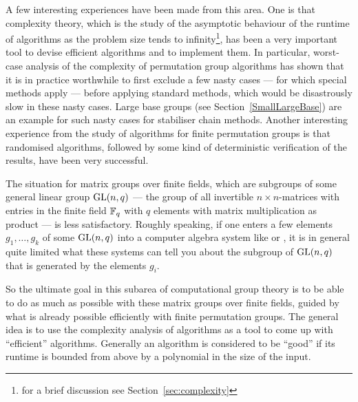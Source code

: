 A few interesting experiences have been made from this area. One is that 
complexity theory,
which is the study of the asymptotic behaviour of the runtime of algorithms 
as the problem size tends to infinity\footnote{for a brief discussion see 
Section~\ref{sec:complexity}}, has been a very important tool to
devise efficient algorithms and to implement them. In particular,
worst-case analysis of the complexity of permutation group 
algorithms has shown that
it is in practice worthwhile to first exclude a few nasty cases ---
for which special methods apply --- before applying standard methods,
which would be disastrously slow in these nasty cases. Large base
groups (see Section~\ref{SmallLargeBase}) are an example for such
nasty cases for stabiliser chain methods.
Another interesting
experience from the study of algorithms for finite permutation groups 
is that randomised algorithms, followed by some kind of
deterministic verification of the results, have been very successful.

The situation for matrix groups over finite fields, which are subgroups 
of some general linear group $\GL(n,q)$ --- the group of all
invertible $n \times n$-matrices with entries in the finite field
$\mathbb{F}_q$ with $q$ elements with matrix multiplication as product ---
is less satisfactory. Roughly speaking, if one enters a few
elements $g_1, \ldots, g_k$ of some $\GL(n,q)$ into a computer algebra 
system like {\GAP} or {\MAGMA}, it is in general quite limited what
these systems can tell you about the subgroup of $\GL(n,q)$ that is
generated by the elements $g_i$.

So the ultimate goal in this subarea of computational group theory
is to be able to do as much as possible with these matrix groups over
finite fields, guided by what is already possible efficiently with
finite permutation groups. The general idea is to use the complexity
analysis of algorithms as a tool to come up with ``efficient''
algorithms. Generally an algorithm is considered to be ``good'' if
its runtime is bounded from above by a polynomial in the size of the
input.

